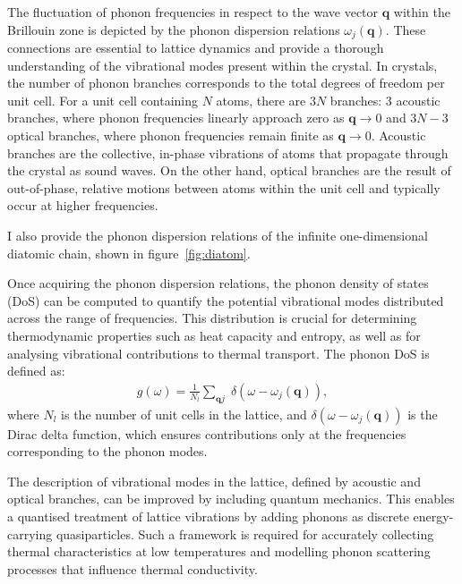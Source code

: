 The fluctuation of phonon frequencies in respect to the wave vector $\mathbf{q}$ within the Brillouin zone is depicted by the phonon dispersion relations $\omega_{j}(\mathbf{q})$.
These connections are essential to lattice dynamics and provide a thorough understanding of the vibrational modes present within the crystal.
In crystals, the number of phonon branches corresponds to the total degrees of freedom per unit cell.
For a unit cell containing $N$ atoms, there are $3N$ branches: $3$ acoustic branches, where phonon frequencies linearly approach zero as $\mathbf{q}\rightarrow0$ and $3N-3$ optical branches, where phonon frequencies remain finite as $\mathbf{q}\rightarrow0$.
Acoustic branches are the collective, in-phase vibrations of atoms that propagate through the crystal as sound waves.  On the other hand, optical branches are the result of out-of-phase, relative motions between atoms within the unit cell and typically occur at higher frequencies.

I also provide the phonon dispersion relations of the infinite one-dimensional diatomic chain, shown in figure~\ref{fig:diatom}.

Once acquiring the phonon dispersion relations, the phonon density of states (DoS) can be computed to quantify the potential vibrational modes distributed across the range of frequencies.  This distribution is crucial for determining thermodynamic properties such as heat capacity and entropy, as well as for analysing vibrational contributions to thermal transport.
The phonon DoS \cite{Togo2015} is defined as:
\begin{equation}
\label{equ:2.11}
    \begin{split}
         g(\omega) = \frac{1}{N_{l}}\sum_{\mathbf{q}j}\;\delta(\omega-\omega_{j}(\mathbf{q})),
    \end{split}
\end{equation}
where $N_{l}$ is the number of unit cells in the lattice, and $\delta(\omega-\omega_{j}(\mathbf{q}))$ is the Dirac delta function, which ensures contributions only at the frequencies corresponding to the phonon modes.

The description of vibrational modes in the lattice, defined by acoustic and optical branches, can be improved by including quantum mechanics. This enables a quantised treatment of lattice vibrations by adding phonons as discrete energy-carrying quasiparticles. Such a framework is required for accurately collecting thermal characteristics at low temperatures and modelling phonon scattering processes that influence thermal conductivity.

